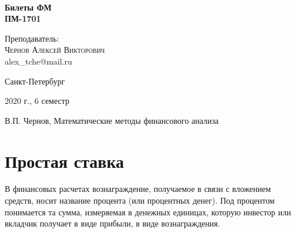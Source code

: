 \documentclass[aps,%
12pt,%
final,%
oneside,
onecolumn,%
musixtex, %
superscriptaddress,%
centertags]{article} %
\theoremstyle{plain}
\theoremstyle{definition}
\theoremstyle{remark}
\begin{document}
\begin{titlepage} 
\begin{center}
 
\textbf{}\\[10.0cm]
\textbf{\LARGE Билеты ФМ}\\[0.5cm]
\textbf{\Large ПМ-1701} \\[0.2cm]

\begin{center} \large
{Преподаватель:} \\[0.5cm]
\textsc {Чернов Алексей Викторович}\\
{alex\_tche@mail.ru}\\
\end{center}
\vfill 

{\large {Санкт-Петербург}} \par
{\large {2020 г., 6 семестр}}
\end{center} 
\end{titlepage}

\begin{thebibliography}{3}
	В.П. Чернов, Математические методы финансового анализа
\end{thebibliography}
\tableofcontents
\newpage
\section{Простая ставка}

В финансовых расчетах вознаграждение, получаемое в связи с вложением средств, носит название процента (или процентных денег). Под процентом понимается та сумма, измеряемая в денежных единицах, которую инвестор или вкладчик получает в виде прибыли, в виде вознаграждения.
\end{document}
